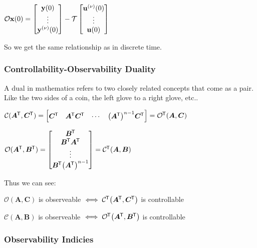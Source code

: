 \documentclass[11pt]{article}
\begin{document}
  \(\mathcal{O}\mathbf{x}(0) =
  \begin{bmatrix}
    \mathbf{y}(0) \\
    \vdots \\
    \mathbf{y}^{(\nu)}(0)
  \end{bmatrix} -
  \mathcal{T}
  \begin{bmatrix}
    \mathbf{u}^{(\nu)}(0) \\
    \vdots \\
    \mathbf{u}(0) \\
  \end{bmatrix}\)

  So we get the same relationship as in discrete time.

  \subsubsection{Controllability-Observability Duality}

  A dual in mathematics refers to two closely related concepts that come as a pair.
  Like the two sides of a coin, the left glove to a right glove, etc..

  \(\mathcal{C}(\bm{A}^{\mkern-1.5mu\mathsf{T}}, \bm{C}^{\mkern-1.5mu\mathsf{T}}) =
  \begin{bmatrix}
    \bm{C}^{\mkern-1.5mu\mathsf{T}} & \bm{A}^{\mkern-1.5mu\mathsf{T}}\bm{C}^{\mkern-1.5mu\mathsf{T}} & \cdots & {\left( \bm{A}^{\mkern-1.5mu\mathsf{T}} \right)}^{n - 1}\bm{C}^{\mkern-1.5mu\mathsf{T}}
  \end{bmatrix} = \mathcal{O}^{\mkern-1.5mu\mathsf{T}}(\bm{A}, \bm{C})\)

  \(\mathcal{O}(\bm{A}^{\mkern-1.5mu\mathsf{T}}, \bm{B}^{\mkern-1.5mu\mathsf{T}}) =
  \begin{bmatrix}
    \bm{B}^{\mkern-1.5mu\mathsf{T}} \\
    \bm{B}^{\mkern-1.5mu\mathsf{T}}\bm{A}^{\mkern-1.5mu\mathsf{T}} \\
    \vdots \\
    \bm{B}^{\mkern-1.5mu\mathsf{T}}{\left( \bm{A}^{\mkern-1.5mu\mathsf{T}} \right)}^{n - 1}
  \end{bmatrix} = \mathcal{C}^{\mkern-1.5mu\mathsf{T}}(\bm{A}, \bm{B})\)

  Thus we can see:

  \(\mathcal{O}(\bm{A}, \bm{C})\) is observeable \(\iff \mathcal{C}^{\mkern-1.5mu\mathsf{T}}{\left( \bm{A}^{\mkern-1.5mu\mathsf{T}}, \bm{C}^{\mkern-1.5mu\mathsf{T}} \right)}\) is
  controllable

  \(\mathcal{C}(\bm{A}, \bm{B})\) is observeable \(\iff \mathcal{O}^{\mkern-1.5mu\mathsf{T}}{\left( \bm{A}^{\mkern-1.5mu\mathsf{T}}, \bm{B}^{\mkern-1.5mu\mathsf{T}} \right)}\) is
  controllable

  \pagebreak

  \subsubsection{Observability Indicies}
\end{document}
